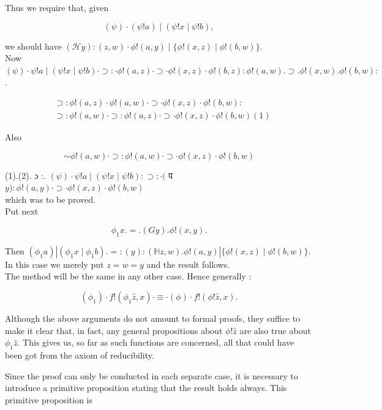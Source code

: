 \documentclass[10pt]{article}
\begin{document}
Thus we require that, given

$$
(\psi) \cdot(\psi!a) \mid(\psi!x \mid \psi!b),
$$

we should have $(\mathcal{H} y):(z, w) \cdot \phi!(a, y) \mid\{\phi!(x, z) \mid \phi!(b, w)\}$.\\
Now\\
$(\psi) \cdot \psi!a \mid(\psi!x \mid \psi!b) \cdot \supset: \cdot \phi!(a, z) \cdot \supset \cdot \phi!(x, z) \cdot \phi!(b, z): \phi!(a, w) . \supset . \phi!(x, w) . \phi!(b, w):$.

$$
\begin{aligned}
& \supset: \phi!(a, z) \cdot \phi!(a, w) \cdot \supset \cdot \phi!(x, z) \cdot \phi!(b, w): \\
& \supset: \phi!(a, w) \cdot \supset: \phi!(a, z) \cdot \supset \cdot \phi!(x, z) \cdot \phi!(b, w)(1)
\end{aligned}
$$

Also


\begin{equation*}
\sim \phi!(a, w) \cdot \supset: \phi!(a, w) \cdot \supset \cdot \phi!(x, z) \cdot \phi!(b, w) \tag{2}
\end{equation*}


(1).(2). ɔ :. $(\psi) \cdot \psi!a \mid(\psi!x \mid \psi!b): \supset: \cdot($ प $y): \phi!(a, y) \cdot \supset \cdot \phi!(x, z) \cdot \phi!(b, w)$\\
which was to be proved.\\
Put next

$$
\phi_{1} x .=.(G y) . \phi!(x, y) .
$$

Then $\left(\phi_{1} a\right)\left|\left(\phi_{1} x \mid \phi_{1} b\right) .=:(y):(\mathbb{H} z, w) . \phi!(a, y)\right|\{\phi!(x, z) \mid \phi!(b, w)\}$.\\
In this case we merely put $z=w=y$ and the result follows.\\
The method will be the same in any other case. Hence generally :

$$
\left(\phi_{1}\right) \cdot f!\left(\phi_{1} \hat{z}, x\right) \cdot \equiv \cdot(\phi) \cdot f!(\phi!\hat{z}, x) .
$$

Although the above arguments do not amount to formal proofs, they suffice to make it clear that, in fact, any general propositions about $\phi!\hat{z}$ are also true about $\phi_{1} \hat{z}$. This gives us, so far as such functions are concerned, all that could have been got from the axiom of reducibility.

Since the proof can only be conducted in each separate case, it is necessary to introduce a primitive proposition stating that the result holds always. This primitive proposition is
\end{document}
